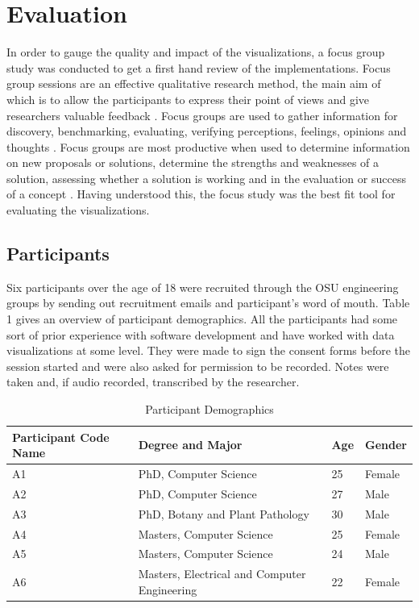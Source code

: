 \documentclass[seploa]{beavtex}
\begin{document}
\chapter{Evaluation}
In order to gauge the quality and impact of the visualizations, a focus group study was conducted to get a first hand review of the implementations. Focus group sessions are an effective qualitative research method, the main aim of which is to allow the participants to express their point of views and give researchers valuable feedback \cite{villard}.  Focus groups are used to gather information for discovery, benchmarking, evaluating, verifying perceptions, feelings, opinions and thoughts \cite{patton1990}. Focus groups are most productive when used to determine information on new proposals or solutions, determine the strengths and weaknesses of a solution, assessing whether a solution is working and in the evaluation or success of a concept \cite{greenbaum1993}. Having understood this, the focus study was the best fit tool for evaluating the visualizations.

\section{Participants}
Six participants over the age of 18 were recruited through the OSU engineering groups by sending out recruitment emails and participant's word of mouth. Table 1 gives an overview of participant demographics. All the participants had some sort of prior experience with software development and have worked with data visualizations at some level. They were made to sign the consent forms before the session started and were also asked for permission to be recorded. Notes were taken and, if audio recorded, transcribed by the researcher.

\begin{table}
\centering
\begin{tabular}{ |p{3cm}||p{5cm}|p{3cm}|p{3cm}|  }
 \hline
Participant Code Name & Degree and Major & Age & Gender\\
 \hline
 A1 & PhD, Computer Science & 25 & Female\\
 A2 & PhD, Computer Science & 27 & Male\\
 A3 & PhD, Botany and Plant Pathology & 30 & Male\\
 A4 & Masters, Computer Science & 25 & Female\\
 A5 & Masters, Computer Science & 24 & Male\\
 A6 & Masters, Electrical and Computer Engineering & 22 & Female\\
 \hline
\end{tabular}
\caption{Participant Demographics}
\label{tab:table1}
\end{table}
\end{document}
